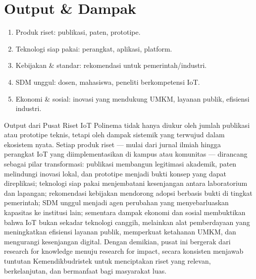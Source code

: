 \documentclass[11pt,a4paper]{article}
\begin{document}
\section{Output \& Dampak}
\begin{enumerate}
    \item Produk riset: publikasi, paten, prototipe.
    \item Teknologi siap pakai: perangkat, aplikasi, platform.
    \item Kebijakan \& standar: rekomendasi untuk pemerintah/industri.
    \item SDM unggul: dosen, mahasiswa, peneliti berkompetensi IoT.
    \item Ekonomi \& sosial: inovasi yang mendukung UMKM, layanan publik, efisiensi industri.
\end{enumerate}

Output dari Pusat Riset IoT Polinema tidak hanya diukur oleh jumlah publikasi atau prototipe teknis, tetapi oleh dampak sistemik yang terwujud dalam ekosistem nyata. Setiap produk riset — mulai dari jurnal ilmiah hingga perangkat IoT yang diimplementasikan di kampus atau komunitas — dirancang sebagai pilar transformasi: publikasi membangun legitimasi akademik, paten melindungi inovasi lokal, dan prototipe menjadi bukti konsep yang dapat direplikasi; teknologi siap pakai menjembatani kesenjangan antara laboratorium dan lapangan; rekomendasi kebijakan mendorong adopsi berbasis bukti di tingkat pemerintah; SDM unggul menjadi agen perubahan yang menyebarluaskan kapasitas ke institusi lain; sementara dampak ekonomi dan sosial membuktikan bahwa IoT bukan sekadar teknologi canggih, melainkan alat pemberdayaan yang meningkatkan efisiensi layanan publik, memperkuat ketahanan UMKM, dan mengurangi kesenjangan digital. Dengan demikian, pusat ini bergerak dari research for knowledge menuju research for impact, secara konsisten menjawab tuntutan Kemendikbudristek untuk menciptakan riset yang relevan, berkelanjutan, dan bermanfaat bagi masyarakat luas.

\newpage

\end{document}
